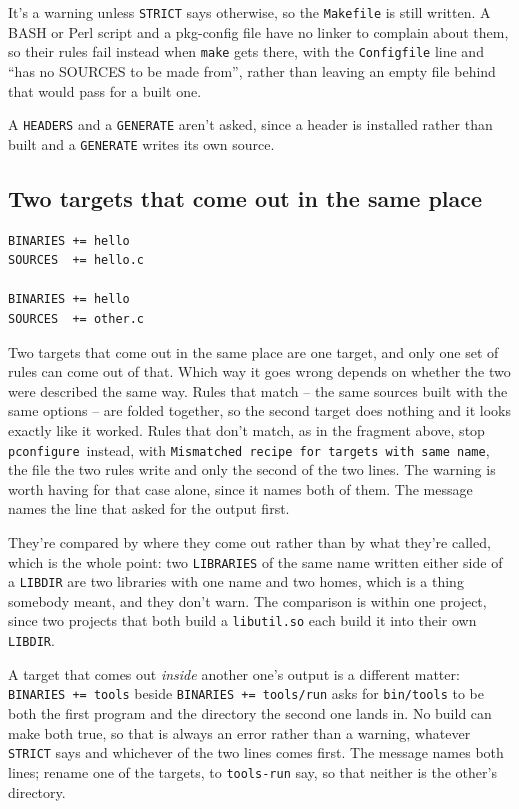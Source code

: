 \documentclass{article}
\newcommand{\pconfigure}{\texttt{pconfigure}}
\begin{document}
It's a warning unless \texttt{STRICT} says otherwise, so the
\texttt{Makefile} is still written.  A BASH or Perl script and a
pkg-config file have no linker to complain about them, so their rules
fail instead when \texttt{make} gets there, with the
\texttt{Configfile} line and ``has no SOURCES to be made from'',
rather than leaving an empty file behind that would pass for a built
one.

A \texttt{HEADERS} and a \texttt{GENERATE} aren't asked, since a
header is installed rather than built and a \texttt{GENERATE} writes
its own source.

\subsection{Two targets that come out in the same place}

\begin{verbatim}
BINARIES += hello
SOURCES  += hello.c

BINARIES += hello
SOURCES  += other.c
\end{verbatim}

Two targets that come out in the same place are one target, and only
one set of rules can come out of that.  Which way it goes wrong
depends on whether the two were described the same way.  Rules that
match -- the same sources built with the same options -- are folded
together, so the second target does nothing and it looks exactly like
it worked.  Rules that don't match, as in the fragment above, stop
\pconfigure\ instead, with \texttt{Mismatched recipe for targets with
same name}, the file the two rules write and only the second of the two
lines.  The warning is worth having for that case alone, since it names
both of them.  The
message names the line that asked for the output first.

They're compared by where they come out rather than by what they're
called, which is the whole point: two \texttt{LIBRARIES} of the same
name written either side of a \texttt{LIBDIR} are two libraries with
one name and two homes, which is a thing somebody meant, and they
don't warn.  The comparison is within one project, since two projects
that both build a \texttt{libutil.so} each build it into their own
\texttt{LIBDIR}.

A target that comes out \emph{inside} another one's output is a
different matter: \texttt{BINARIES += tools} beside
\texttt{BINARIES += tools/run} asks for \texttt{bin/tools} to be both
the first program and the directory the second one lands in.  No
build can make both true, so that is always an error rather than a
warning, whatever \texttt{STRICT} says and whichever of the two lines
comes first.  The message names both lines; rename one of the
targets, to \texttt{tools-run} say, so that neither is the other's
directory.
\end{document}
